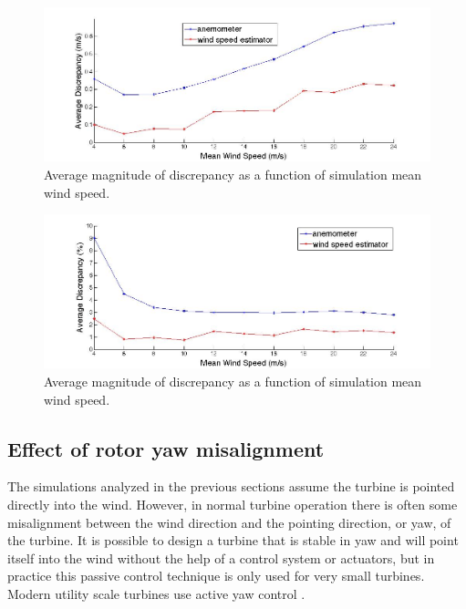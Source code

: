 \begin{figure}[ht]
	\centering
		\includegraphics[width = \linewidth]{Figures/ch2Figures/fig2-18.jpg}
		
	\caption{Average magnitude of discrepancy as a function of simulation mean wind speed.}
	\label{fig2-18}
\end{figure}



\begin{figure}[ht]
	\centering
		\includegraphics[width = \linewidth]{Figures/ch2Figures/fig2-19.jpg}
		
	\caption{Average magnitude of discrepancy as a function of simulation mean wind speed.}
	\label{fig2-19}
\end{figure}


\subsection{Effect of rotor yaw misalignment}\label{section2-4-2} 

The simulations analyzed in the previous sections assume the turbine is pointed directly into the wind. However, in normal turbine operation there is often some misalignment between the wind direction and the pointing direction, or yaw, of the turbine. It is possible to design a turbine that is stable in yaw and will point itself into the wind without the help of a control system or actuators, but in practice this passive control technique is only used for very small turbines. Modern utility scale turbines use active yaw control \cite{burton2011}.

